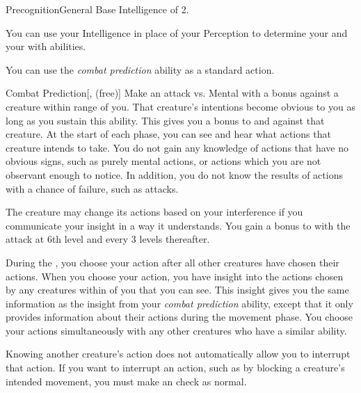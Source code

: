     \begin{feat}{Precognition}{General}
        \featpre Base Intelligence of 2.

         You can use your Intelligence in place of your Perception to determine your  and your  with  abilities.

         You can use the \textit{combat prediction} ability as a standard action.
        \begin{freeability}{Combat Prediction}[,  (free)]
            Make an attack vs. Mental with a   bonus against a creature within \rngmed range of you.
            \hit That creature's intentions become obvious to you as long as you sustain this ability.
            This gives you a  bonus to  and  against that creature.
            At the start of each phase, you can see and hear what actions that creature intends to take.
            You do not gain any knowledge of actions that have no obvious signs, such as purely mental actions, or actions which you are not observant enough to notice.
            In addition, you do not know the results of actions with a chance of failure, such as attacks.

            The creature may change its actions based on your interference if you communicate your insight in a way it understands.
            \rankline
            You gain a  bonus to  with the attack at 6th level and every 3 levels thereafter.
        \end{freeability}

         During the , you choose your action after all other creatures have chosen their actions.
        When you choose your action, you have insight into the actions chosen by any creatures within \shortrange of you that you can see.
        This insight gives you the same information as the insight from your \textit{combat prediction} ability, except that it only provides information about their actions during the movement phase.
        You choose your actions simultaneously with any other creatures who have a similar ability.

        Knowing another creature's action does not automatically allow you to interrupt that action.
        If you want to interrupt an action, such as by blocking a creature's intended movement, you must make an  check as normal.


\end{feat}
